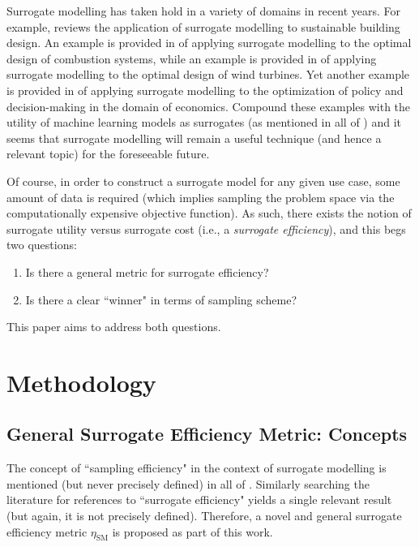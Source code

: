 \documentclass[conference]{IEEEtran}
\begin{document}
	Surrogate modelling has taken hold in a variety of domains in recent years. For example, \cite{Westermann_2019} reviews the application of surrogate modelling to sustainable building design. An example is provided in \cite{Liu_2023} of applying surrogate modelling to the optimal design of combustion systems, while an example is provided in \cite{Haghi_2022} of applying surrogate modelling to the optimal design of wind turbines. Yet another example is provided in \cite{vanderHoog_2018} of applying surrogate modelling to the optimization of policy and decision-making in the domain of economics. Compound these examples with the utility of machine learning models as surrogates (as mentioned in all of \cite{Westermann_2019, Liu_2023, vanderHoog_2018}) and it seems that surrogate modelling will remain a useful technique (and hence a relevant topic) for the foreseeable future.
	
	Of course, in order to construct a surrogate model for any given use case, some amount of data is required (which implies sampling the problem space via the computationally expensive objective function). As such, there exists the notion of surrogate utility versus surrogate cost (i.e., a \textit{surrogate efficiency}), and this begs two questions:
	
\begin{enumerate}
	\item Is there a general metric for surrogate efficiency?
	\item Is there a clear ``winner" in terms of sampling scheme?
\end{enumerate}

\noindent This paper aims to address both questions.

\section{Methodology}

\subsection{General Surrogate Efficiency Metric: Concepts}

The concept of ``sampling efficiency" in the context of surrogate modelling is mentioned (but never precisely defined) in all of \cite{Gong_2017, Westermann_2019_2, Yin_2011}. Similarly searching the literature for references to ``surrogate efficiency" yields a single relevant result \cite{Casper_2016} (but again, it is not precisely defined). Therefore, a novel and general surrogate efficiency metric $\eta_\textrm{SM}$ is proposed as part of this work.
\end{document}
